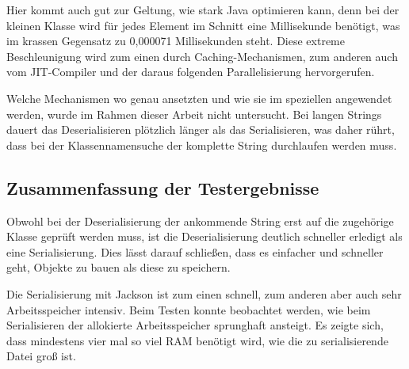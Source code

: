 Hier kommt auch gut zur Geltung, wie stark Java optimieren kann, denn bei der kleinen Klasse wird f\"ur jedes Element im Schnitt eine Millisekunde ben\"otigt, was im krassen Gegensatz zu 0,000071 Millisekunden steht. Diese extreme Beschleunigung wird zum einen durch Caching-Mechanismen, zum anderen auch vom JIT-Compiler und der daraus folgenden Parallelisierung hervorgerufen. 

Welche Mechanismen wo genau ansetzten und wie sie im speziellen angewendet werden, wurde im Rahmen dieser Arbeit nicht untersucht.
Bei langen Strings dauert das Deserialisieren pl\"otzlich l\"anger als das Serialisieren, was daher r\"uhrt, dass bei der Klassennamensuche der komplette String durchlaufen werden muss.

\subsection{Zusammenfassung der Testergebnisse}
Obwohl bei der Deserialisierung der ankommende String erst auf die zugeh\"orige Klasse gepr\"uft werden muss, ist die Deserialisierung deutlich schneller erledigt als eine Serialisierung. Dies l\"asst darauf schlie\ss{}en, dass es einfacher und schneller geht, Objekte zu bauen als diese zu speichern.

Die Serialisierung mit Jackson ist zum einen schnell, zum anderen aber auch sehr Arbeitsspeicher intensiv. Beim Testen konnte beobachtet werden, wie beim Serialisieren der allokierte Arbeitsspeicher sprunghaft ansteigt. Es zeigte sich, dass mindestens vier mal so viel RAM ben\"otigt wird, wie die zu serialisierende Datei gro\ss{} ist. 







